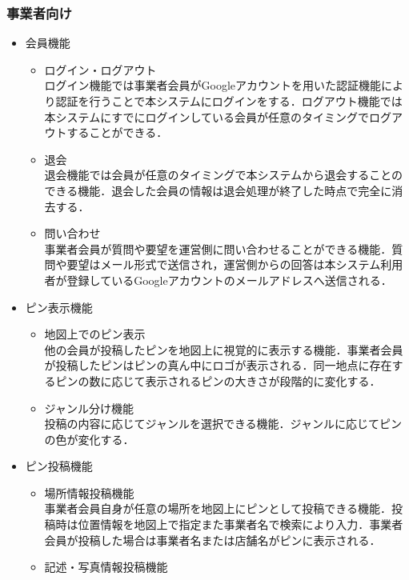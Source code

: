 \subsubsection{事業者向け}
\begin{itemize}[itemsep=10pt]
    \item 会員機能
    \begin{itemize}[itemsep=10pt]
        \item ログイン・ログアウト \mbox{}\\
        ログイン機能では事業者会員がGoogleアカウントを用いた認証機能により認証を行うことで本システムにログインをする．ログアウト機能では本システムにすでにログインしている会員が任意のタイミングでログアウトすることができる．
        \item 退会 \mbox{}\\
        退会機能では会員が任意のタイミングで本システムから退会することのできる機能．退会した会員の情報は退会処理が終了した時点で完全に消去する．
        \item 問い合わせ \mbox{}\\
        事業者会員が質問や要望を運営側に問い合わせることができる機能．質問や要望はメール形式で送信され，運営側からの回答は本システム利用者が登録しているGoogleアカウントのメールアドレスへ送信される．
    \end{itemize}
    \item ピン表示機能
    \begin{itemize}[itemsep=10pt]
        \item 地図上でのピン表示 \mbox{}\\
        他の会員が投稿したピンを地図上に視覚的に表示する機能．事業者会員が投稿したピンはピンの真ん中にロゴが表示される．同一地点に存在するピンの数に応じて表示されるピンの大きさが段階的に変化する．
        \item ジャンル分け機能 \mbox{}\\
        投稿の内容に応じてジャンルを選択できる機能．ジャンルに応じてピンの色が変化する．
    \end{itemize}
    \item ピン投稿機能
    \begin{itemize}[itemsep=10pt]
        \item 場所情報投稿機能 \mbox{}\\
        事業者会員自身が任意の場所を地図上にピンとして投稿できる機能．投稿時は位置情報を地図上で指定また事業者名で検索により入力．事業者会員が投稿した場合は事業者名または店舗名がピンに表示される．
        \item 記述・写真情報投稿機能 \mbox{}\\

\end{itemize}
\end{itemize}
